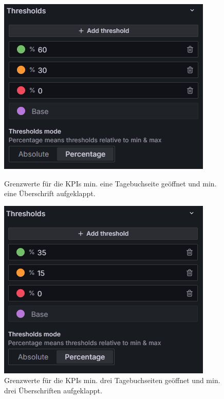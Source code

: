 \begin{figure}[H]
    \centering
    \begin{minipage}{0.49\textwidth}
        \centering
        \includegraphics[width=\linewidth, keepaspectratio]{images/thresholds-min-eins.png}
        \caption{Grenzwerte für die KPIs \glqq min. eine Tagebuchseite geöffnet\grqq{} und \glqq min. eine Überschrift aufgeklappt\grqq{}.}
        \label{fig:thresholds-min-eins}
    \end{minipage}
    \hfill
    \begin{minipage}{0.49\textwidth}
        \centering
        \includegraphics[width=\linewidth, keepaspectratio]{images/thresholds-min-drei.png}
        \caption{Grenzwerte für die KPIs \glqq min. drei Tagebuchseiten geöffnet\grqq{} und \glqq min. drei Überschriften aufgeklappt\grqq{}.}
        \label{fig:thresholds-min-drei}
    \end{minipage}
\end{figure}

